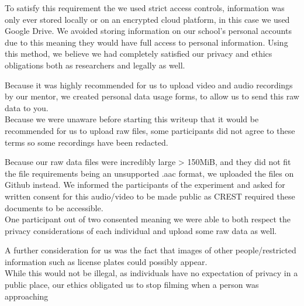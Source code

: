 \documentclass[14pt]{article}
\begin{document}
To satisfy this requirement the we used strict access controls, information was only ever stored locally or on an encrypted cloud platform, in this case we used Google Drive. We avoided storing information on our school's personal accounts due to this meaning they would have full access to personal information. Using this method, we believe we had completely satisfied our privacy and ethics obligations both as researchers and legally as well.

Because it was highly recommended for us to upload video and audio recordings by our mentor, we created personal data usage forms, to allow us to send this raw data to you.\\
Because we were unaware before starting this writeup that it would be recommended for us to upload raw files, some participants did not agree to these terms so some recordings have been redacted.

Because our raw data files were incredibly large > 150MiB, and they did not fit the file requirements being an unsupported .aac format, we uploaded the files on Github instead. We informed the participants of the experiment and asked for written consent for this audio/video to be made public as CREST required these documents to be accessible. \\
One participant out of two consented meaning we were able to both respect the privacy considerations of each individual and upload some raw data as well.

A further consideration for us was the fact that images of other people/restricted information such as license plates could possibly appear.\\While this would not be illegal, as individuals have no expectation of privacy in a public place, our ethics obligated us to stop filming when a person was approaching
\end{document}
